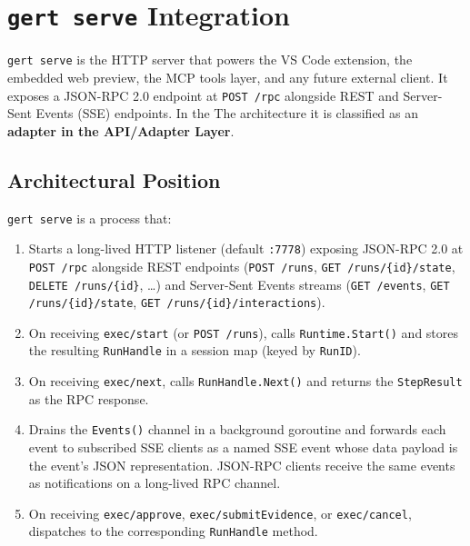 \section{\texttt{gert serve} Integration}

\texttt{gert serve} is the HTTP server that powers the VS Code extension, the embedded
web preview, the MCP tools layer, and any future external client. It exposes a JSON-RPC 2.0
endpoint at \texttt{POST /rpc} alongside REST and Server-Sent Events (SSE) endpoints. In the
The architecture it is classified as an \textbf{adapter in the API/Adapter Layer}.

\subsection{Architectural Position}

\texttt{gert serve} is a process that:
\begin{enumerate}
  \item Starts a long-lived HTTP listener (default \texttt{:7778}) exposing JSON-RPC 2.0 at
        \texttt{POST /rpc} alongside REST endpoints (\texttt{POST /runs}, \texttt{GET /runs/\{id\}/state},
        \texttt{DELETE /runs/\{id\}}, \ldots) and Server-Sent Events streams
        (\texttt{GET /events}, \texttt{GET /runs/\{id\}/state}, \texttt{GET /runs/\{id\}/interactions}).
  \item On receiving \texttt{exec/start} (or \texttt{POST /runs}), calls \texttt{Runtime.Start()} and stores the
        resulting \texttt{RunHandle} in a session map (keyed by \texttt{RunID}).
  \item On receiving \texttt{exec/next}, calls \texttt{RunHandle.Next()} and returns the
        \texttt{StepResult} as the RPC response.
  \item Drains the \texttt{Events()} channel in a background goroutine and forwards each
        event to subscribed SSE clients as a named SSE event whose data payload is the
        event's JSON representation. JSON-RPC clients receive the same events as
        notifications on a long-lived RPC channel.
  \item On receiving \texttt{exec/approve}, \texttt{exec/submitEvidence}, or
        \texttt{exec/cancel}, dispatches to the corresponding \texttt{RunHandle} method.
\end{enumerate}

